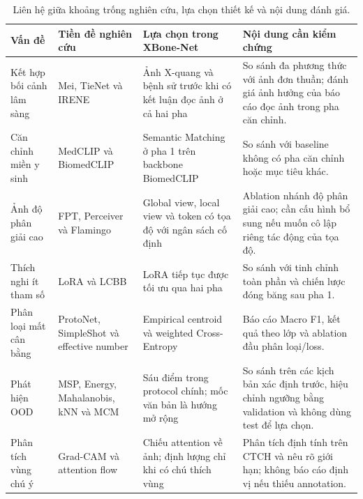 \begin{table}[htbp]
\centering
\small
\renewcommand{\arraystretch}{1.2}
\begin{tabularx}{\textwidth}{L{3.0cm} L{3.6cm} X X}
\toprule
\textbf{Vấn đề} & \textbf{Tiền đề nghiên cứu} & \textbf{Lựa chọn trong XBone-Net} & \textbf{Nội dung cần kiểm chứng} \\
\midrule
Kết hợp bối cảnh lâm sàng & Mei, TieNet và IRENE \cite{XMei,TieNet,IRENE} & Ảnh X-quang và bệnh sử trước khi có kết luận đọc ảnh ở cả hai pha & So sánh đa phương thức với ảnh đơn thuần; đánh giá ảnh hưởng của báo cáo đọc ảnh trong pha căn chỉnh. \\
\addlinespace
Căn chỉnh miền y sinh & MedCLIP và BiomedCLIP \cite{MedCLIP,BiomedCLIP} & Semantic Matching ở pha 1 trên backbone BiomedCLIP & So sánh với baseline không có pha căn chỉnh hoặc mục tiêu khác. \\
\addlinespace
Ảnh độ phân giải cao & FPT, Perceiver và Flamingo \cite{FPT,Jaegle2021Perceiver,Alayrac2022Flamingo} & Global view, local view và token có tọa độ với ngân sách cố định & Ablation nhánh độ phân giải cao; cần cấu hình bổ sung nếu muốn cô lập riêng tác động của tọa độ. \\
\addlinespace
Thích nghi ít tham số & LoRA và LCBB \cite{Hu2022LoRA,LCBB} & LoRA tiếp tục được tối ưu qua hai pha & So sánh với tinh chỉnh toàn phần và chiến lược đóng băng sau pha 1. \\
\addlinespace
Phân loại mất cân bằng & ProtoNet, SimpleShot và effective number \cite{Snell2017ProtoNet,Wang2019SimpleShot,Cui2019ClassBalanced} & Empirical centroid và weighted Cross-Entropy & Báo cáo Macro F1, kết quả theo lớp và ablation đầu phân loại/loss. \\
\addlinespace
Phát hiện OOD & MSP, Energy, Mahalanobis, kNN và MCM \cite{Hendrycks2017MSP,Liu2020EnergyOOD,Lee2018MahalanobisOOD,Sun2022KNN,Ming2022MCM} & Sáu điểm trong protocol chính; mốc văn bản là hướng mở rộng & So sánh trên các kịch bản xác định trước, hiệu chỉnh ngưỡng bằng validation và không dùng test để lựa chọn. \\
\addlinespace
Phân tích vùng chú ý & Grad-CAM và attention flow \cite{Selvaraju2017GradCAM,Abnar2020AttentionFlow} & Chiếu attention về ảnh; định lượng chỉ khi có chú thích vùng & Phân tích định tính trên CTCH và nêu rõ giới hạn; không báo cáo định vị nếu thiếu annotation. \\
\bottomrule
\end{tabularx}
\caption{Liên hệ giữa khoảng trống nghiên cứu, lựa chọn thiết kế và nội dung đánh giá.}
\label{tab:ch2_gap_mapping}
\end{table}

